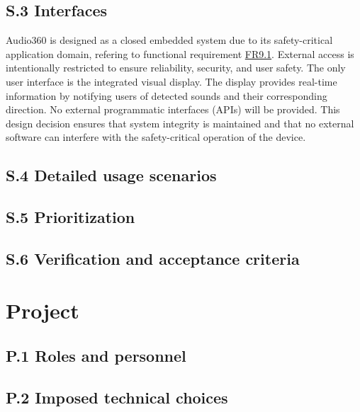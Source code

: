 \documentclass[12pt]{article}
\theoremstyle{definition}
\begin{document}
\subsection{S.3 Interfaces}
Audio360 is designed as a closed embedded system due to its safety-critical
application domain, refering to functional requirement \hyperref[FR9_1]{FR9.1}.
External access is intentionally restricted to ensure reliability, security,
and user safety.
The only user interface is the integrated visual display. The display provides
real-time information by notifying users of detected sounds and their
corresponding direction.
No external programmatic interfaces (APIs) will be provided. This design
decision ensures that system integrity is maintained and that no external
software can interfere with the safety-critical operation of the device.

\subsection{S.4 Detailed usage scenarios}

\subsection{S.5 Prioritization}

\subsection{S.6 Verification and acceptance criteria}

\section{Project}

\subsection{P.1 Roles and personnel}

\subsection{P.2 Imposed technical choices}
\end{document}
